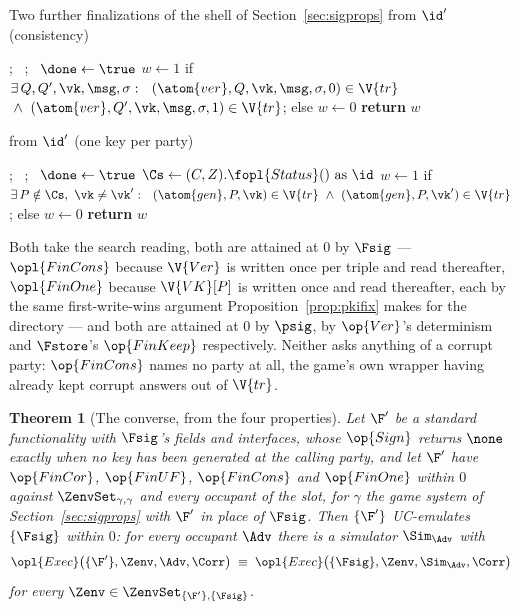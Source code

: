 \documentclass[10pt,oneside,openany]{book}
\theoremstyle{accentdef}
\theoremstyle{accentplain}
\newtheorem{theorem}[definition]{Theorem}
\begin{document}
\begin{interface}[nofloat]{Two further finalizations of the shell of Section~\ref{sec:sigprops}}
 \quad from $\id'$ \quad (consistency)
\begin{algorithmic}[1]
\setcounter{contline}{0}\algcont
\Req{$\neg\done$}; \ ; \ $\done \gets \true$
\State $w \gets 1$ if $\exists\, Q,Q',\vk,\msg,\sigma :\ \
       (\atom{ver},Q,\vk,\msg,\sigma,0) \in \V{tr}$ \label{ln:gcons}
\State \quad ${}\wedge\ (\atom{ver},Q',\vk,\msg,\sigma,1) \in \V{tr}$; \quad else $w \gets 0$
\State \textbf{return} $w$
\algsave
\end{algorithmic}
\vspace{1.4ex}

 \quad from $\id'$ \quad (one key per party)
\begin{algorithmic}[1]
\algcont
\Req{$\neg\done$}; \ ; \ $\done \gets \true$
\State $\Cs \gets (C,Z).\fopl{Status}() \text{ as } \id$
\State $w \gets 1$ if $\exists\, P \notin \Cs,\ \vk \neq \vk' :\ \
       (\atom{gen},P,\vk) \in \V{tr} \ \wedge\ (\atom{gen},P,\vk') \in \V{tr}$; \label{ln:gone}
\State \quad else $w \gets 0$
\State \textbf{return} $w$
\algsave
\end{algorithmic}
\end{interface}

Both take the search reading, both are attained at $0$ by $\Fsig$ --- $\opl{FinCons}$ because
$\V{Ver}$ is written once per triple and read thereafter, $\opl{FinOne}$ because $\V{VK}[P]$ is
written once and read thereafter, each by the same first-write-wins argument
Proposition~\ref{prop:pkifix} makes for the directory --- and both are attained at $0$ by $\psig$,
by $\op{Ver}$'s determinism and $\Fstore$'s $\op{FinKeep}$ respectively. Neither asks anything of
a corrupt party: $\op{FinCons}$ names no party at all, the game's own wrapper having already kept
corrupt answers out of $\V{tr}$.

\begin{theorem}[The converse, from the four properties]\label{thm:sigconv}
Let $\F'$ be a standard functionality with $\Fsig$'s fields and interfaces, whose $\op{Sign}$
returns $\none$ exactly when no key has been generated at the calling party, and let $\F'$ have
$\op{FinCor}$, $\op{FinUF}$, $\op{FinCons}$ and $\op{FinOne}$ within $0$ against
$\ZenvSet_{\gamma,\gamma}$ and every occupant of the slot, for $\gamma$ the game system of
Section~\ref{sec:sigprops} with $\F'$ in place of $\Fsig$. Then $\{\F'\}$ UC-emulates
$\{\Fsig\}$ within $0$: for every occupant $\Adv$ there is a simulator $\Sim_{\Adv}$ with
\[
  \opl{Exec}\bigl(\{\F'\},\Zenv,\Adv,\Corr\bigr)
  \;\equiv\;
  \opl{Exec}\bigl(\{\Fsig\},\Zenv,\Sim_{\Adv},\Corr\bigr)
\]
for every $\Zenv \in \ZenvSet_{\{\F'\},\{\Fsig\}}$.
\end{theorem}
\end{document}

